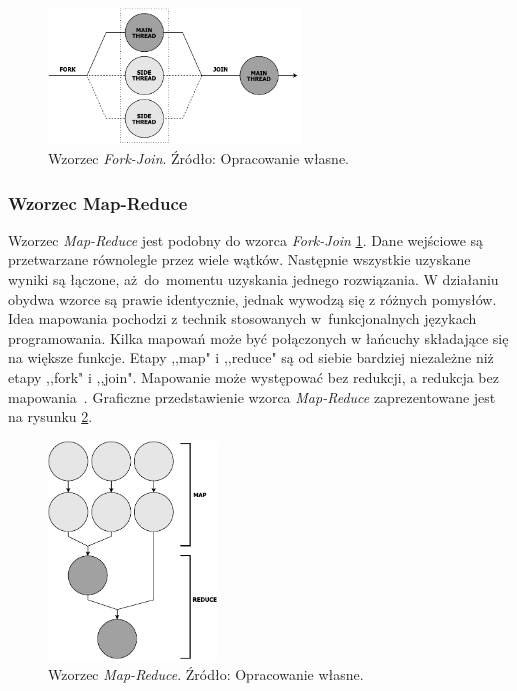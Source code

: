 \documentclass[12pt]{article}
\begin{document}
\begin{figure}[H]
    \centering
	\includegraphics[width=0.6\textwidth]{patterns-fork-join.pdf}
    \caption{Wzorzec \textit{Fork-Join}. Źródło: Opracowanie własne.}
    \label{fig:fork-join}
\end{figure}

\subsubsection{Wzorzec Map-Reduce}
Wzorzec \textit{Map-Reduce} jest podobny do wzorca \textit{Fork-Join} \ref{fig:fork-join}. Dane wejściowe są przetwarzane równolegle przez wiele wątków.
Następnie wszystkie uzyskane wyniki są łączone, aż~do~momentu uzyskania jednego rozwiązania.
W działaniu obydwa wzorce są prawie identycznie, jednak wywodzą się z różnych pomysłów.
Idea mapowania pochodzi z technik stosowanych w~funkcjonalnych językach programowania.
Kilka mapowań może być połączonych w łańcuchy składające się na większe funkcje.
Etapy ,,map" i ,,reduce" są od siebie bardziej niezależne niż etapy ,,fork" i ,,join".
Mapowanie może występować bez redukcji, a redukcja bez mapowania~\cite{parallel-design-patterns}.
Graficzne przedstawienie wzorca \textit{Map-Reduce} zaprezentowane jest na rysunku \ref{fig:map-reduce}.

\begin{figure}[H]
    \centering
	\includegraphics[width=0.4\textwidth]{patterns-map-reduce.pdf}
    \caption{Wzorzec \textit{Map-Reduce}. Źródło: Opracowanie własne.}
    \label{fig:map-reduce}
\end{figure}
\end{document}
